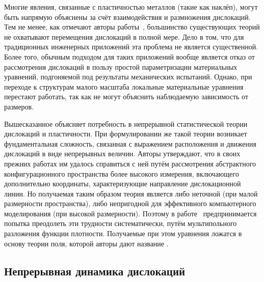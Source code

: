 \documentclass[a4paper, 14pt, titlepage]{extarticle}
\begin{document}
  Многие явления, связанные с пластичностью металлов (такие как наклёп), могут быть напрямую
  объяснены за счёт взаимодействия и размножения дислокаций. Тем не менее, как отмечают авторы
  работы~\cite{hochrainer-cdd}, большинство существующих теорий не охватывают перемещения дислокаций в полной мере.
  Дело в том, что для традиционных инженерных приложений эта проблема не является существенной.
  Более того, обычным подходом для таких приложений вообще является отказ от рассмотрения дислокаций
  в пользу простой параметризации материальных уравнений, подгоняемой под результаты механических
  испытаний. Однако, при переходе к структурам малого масштаба локальные материальные уравнения
  перестают работать, так как не могут объяснить наблюдаемую зависимость от размеров.

  Вышесказанное объясняет потребность в непрерывной статистической теории дислокаций и пластичности. При
  формулировании же такой теории возникает фундаментальная сложность, связанная с выражением
  расположения и движения дислокаций в виде непрерывных величин. Авторы утверждают, что в своих
  прежних работах им удалось справиться с ней путём рассмотрения абстрактного
  конфигурационного пространства более высокого измерения, включающего дополнительно координаты,
  характеризующие направление дислокационной линии. Но получаемая таким образом теория является либо
  неточной (при малой размерности пространства), либо непригодной для эффективного компьютерного
  моделирования (при высокой размерности). Поэтому в работе~\cite{hochrainer-cdd} предпринимается попытка
  преодолеть эти трудности систематически, путём мультипольного разложения функции плотности.
  Получаемые при этом уравнения ложатся в основу теории поля, которой авторы дают название
  .

  \subsection{Непрерывная динамика дислокаций} %
\end{document}
